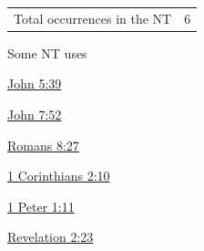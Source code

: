 				\begin{tabular}{ll}
					Total occurrences in the NT & 6
				\end{tabular}
				
				\begin{compactdesc}
					\item[Some NT uses] \textbf{}
						\begin{compactdesc}
							\item[{\hyperref[JOHN-5-39]{John 5:39}}]
							\item[{\hyperref[JOHN-7-52]{John 7:52}}]
							\item[{\hyperref[ROMANS-8-27]{Romans 8:27}}]
							\item[{\hyperref[1CORINTHIANS-2-10]{1 Corinthians 2:10}}]
							\item[{\hyperref[1PETER-1-11]{1 Peter 1:11}}]
							\item[{\hyperref[REVELATIONNT-2-23]{Revelation 2:23}}]
						\end{compactdesc}
				\end{compactdesc}
		
	
		
		
	
		
		
	
